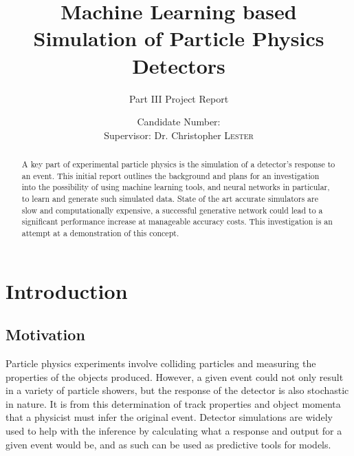 \documentclass{report}
\title{Machine Learning based Simulation of Particle Physics Detectors}
\subtitle{Part III Project Report}
\author{Candidate Number: \\
Supervisor: Dr. Christopher \textsc{Lester}}
\date{\printdate{2017-05-15}}
\begin{document}
\begin{titlepage}
\maketitle


%
%
%

\end{titlepage}

\begin{abstract}
A key part of experimental particle physics is the simulation of a detector's response to an event. This initial report outlines the background and plans for an investigation into the possibility of using machine learning tools, and neural networks in particular, to learn and generate such simulated data. State of the art accurate simulators are slow and computationally expensive, a successful generative network could lead to a significant performance increase at manageable accuracy costs. This investigation is an attempt at a demonstration of this concept.
\end{abstract}

\chapter{Introduction}

\section{Motivation}
Particle physics experiments involve colliding particles and measuring the properties of the objects produced. However, a given event could not only result in a variety of particle showers, but the response of the detector is also stochastic in nature. It is from this determination of track properties and object momenta that a physicist must infer the original event. Detector simulations are widely used to help with the inference by calculating what a response and output for a given event would be, and as such can be used as predictive tools for models.
\end{document}
